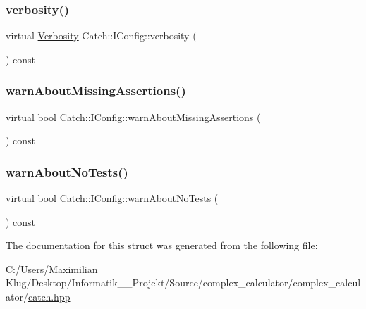 \mbox{\label{struct_catch_1_1_i_config_a55aff5924bdbb3f558775821b1eb4b3d}} 
\subsubsection{\texorpdfstring{verbosity()}{verbosity()}}
{\footnotesize\ttfamily virtual \mbox{\hyperlink{namespace_catch_af85c0d46dfe687d923a157362fd07737}{Verbosity}} Catch\+::\+I\+Config\+::verbosity (\begin{DoxyParamCaption}{ }\end{DoxyParamCaption}) const\hspace{0.3cm}{\ttfamily [pure virtual]}}

\mbox{\label{struct_catch_1_1_i_config_a75d970c495a28e46b8e9b04a1d32149f}} 
\subsubsection{\texorpdfstring{warn\+About\+Missing\+Assertions()}{warnAboutMissingAssertions()}}
{\footnotesize\ttfamily virtual bool Catch\+::\+I\+Config\+::warn\+About\+Missing\+Assertions (\begin{DoxyParamCaption}{ }\end{DoxyParamCaption}) const\hspace{0.3cm}{\ttfamily [pure virtual]}}

\mbox{\label{struct_catch_1_1_i_config_a30590623e3918825f2896c2262bf6fe3}} 
\subsubsection{\texorpdfstring{warn\+About\+No\+Tests()}{warnAboutNoTests()}}
{\footnotesize\ttfamily virtual bool Catch\+::\+I\+Config\+::warn\+About\+No\+Tests (\begin{DoxyParamCaption}{ }\end{DoxyParamCaption}) const\hspace{0.3cm}{\ttfamily [pure virtual]}}



The documentation for this struct was generated from the following file\+:\begin{DoxyCompactItemize}
\item 
C\+:/\+Users/\+Maximilian Klug/\+Desktop/\+Informatik\+\_\+\_\+\+Projekt/\+Source/complex\+\_\+calculator/complex\+\_\+calculator/\mbox{\hyperlink{catch_8hpp}{catch.\+hpp}}\end{DoxyCompactItemize}
